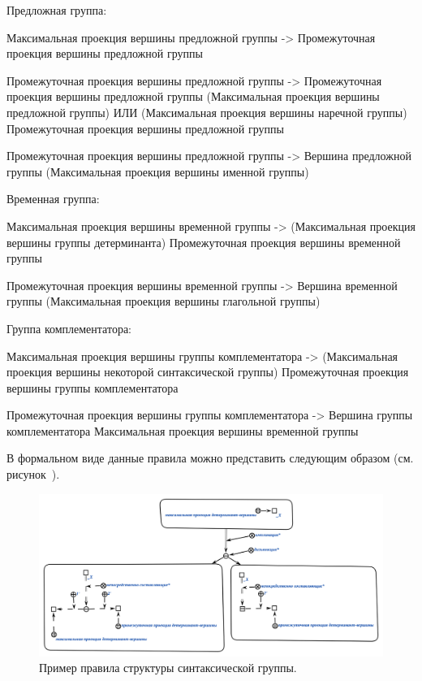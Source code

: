 Предложная группа:
\begin{textitemize}
    \item Максимальная проекция вершины предложной группы -> Промежуточная проекция вершины предложной группы
    \item Промежуточная проекция вершины предложной группы -> Промежуточная проекция вершины предложной группы (Максимальная проекция вершины предложной группы) ИЛИ (Максимальная проекция вершины наречной группы) Промежуточная проекция вершины предложной группы
    \item Промежуточная проекция вершины предложной группы -> Вершина предложной группы (Максимальная проекция вершины именной группы)
\end{textitemize}

Временная группа:
\begin{textitemize}
    \item Максимальная проекция вершины временной группы -> (Максимальная проекция вершины группы детерминанта) Промежуточная проекция вершины временной группы
    \item Промежуточная проекция вершины временной группы -> Вершина временной группы (Максимальная проекция вершины глагольной группы)
\end{textitemize}

Группа комплементатора:
\begin{textitemize}
    \item Максимальная проекция вершины группы комплементатора -> (Максимальная проекция вершины некоторой синтаксической группы) Промежуточная проекция вершины группы комплементатора
    \item Промежуточная проекция вершины группы комплементатора -> Вершина группы комплементатора Максимальная проекция вершины временной группы
\end{textitemize}

В формальном виде данные правила можно представить следующим образом (см.
рисунок~\textit{}).

\begin{figure}[h]
    \centering
    \includegraphics[scale=0.8]{images/part2/chapter_lang/tree_structure_rule}
    \caption{Пример правила структуры синтаксической группы.}
    \label{fig:pic_tree_structure_rule}
\end{figure}

